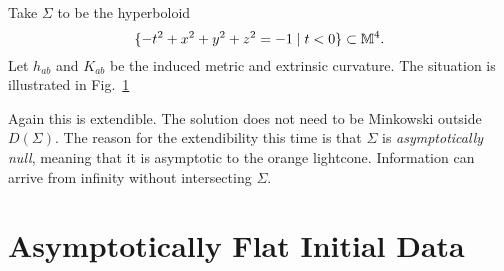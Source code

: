 \begin{example}[]
  Take $\Sigma$ to be the hyperboloid 
  \begin{equation}
    \{-t^2 + x^2 + y^2 + z^2 = -1 \suchthat t < 0\} \subset \mathbb{M}^4.
  \end{equation}
  Let $h_{ab}$ and $K_{ab}$ be the induced metric and extrinsic curvature.
  The situation is illustrated in Fig.~\ref{fig:l8f3}
  \begin{figure}[tbhp]
    \centering
    \def\svgwidth{0.4\columnwidth}
    
    \caption{}
    \label{fig:l8f3}
  \end{figure}
  Again this is extendible.
  The solution does not need to be Minkowski outside $D(\Sigma)$.
  The reason for the extendibility this time is that $\Sigma$ is \emph{asymptotically null}, meaning that it is asymptotic to the orange lightcone.
  Information can arrive from infinity without intersecting $\Sigma$.
\end{example}

\section{Asymptotically Flat Initial Data}%
\label{sec:asymptotically_flat_initial_data}

